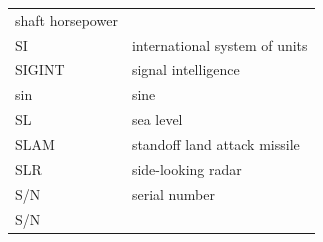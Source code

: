 \documentclass[
]{book}
\begin{document}
\begin{longtable}[]{@{}ll@{}}
\begin{minipage}[t]{0.47\columnwidth}
shaft horsepower\strut
\end{minipage}\tabularnewline
\begin{minipage}[t]{0.47\columnwidth}\raggedright
SI\strut
\end{minipage} & \begin{minipage}[t]{0.47\columnwidth}\raggedright
international system of units\strut
\end{minipage}\tabularnewline
\begin{minipage}[t]{0.47\columnwidth}\raggedright
SIGINT\strut
\end{minipage} & \begin{minipage}[t]{0.47\columnwidth}\raggedright
signal intelligence\strut
\end{minipage}\tabularnewline
\begin{minipage}[t]{0.47\columnwidth}\raggedright
sin\strut
\end{minipage} & \begin{minipage}[t]{0.47\columnwidth}\raggedright
sine\strut
\end{minipage}\tabularnewline
\begin{minipage}[t]{0.47\columnwidth}\raggedright
SL\strut
\end{minipage} & \begin{minipage}[t]{0.47\columnwidth}\raggedright
sea level\strut
\end{minipage}\tabularnewline
\begin{minipage}[t]{0.47\columnwidth}\raggedright
SLAM\strut
\end{minipage} & \begin{minipage}[t]{0.47\columnwidth}\raggedright
standoff land attack missile\strut
\end{minipage}\tabularnewline
\begin{minipage}[t]{0.47\columnwidth}\raggedright
SLR\strut
\end{minipage} & \begin{minipage}[t]{0.47\columnwidth}\raggedright
side-looking radar\strut
\end{minipage}\tabularnewline
\begin{minipage}[t]{0.47\columnwidth}\raggedright
S/N\strut
\end{minipage} & \begin{minipage}[t]{0.47\columnwidth}\raggedright
serial number\strut
\end{minipage}\tabularnewline
\begin{minipage}[t]{0.47\columnwidth}\raggedright
S/N\strut
\end{minipage} & \begin{minipage}[t]{0.47\columnwidth}\raggedright

\end{minipage}
\end{longtable}
\end{document}
